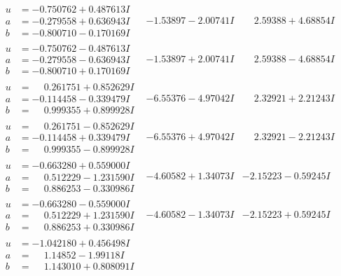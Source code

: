 \documentclass[1p]{elsarticle_modified}
\theoremstyle{definition}
\begin{document}
$$\begin{array}{c|c|c}
\begin{aligned}
u &= -0.750762 + 0.487613 I \\
a &= -0.279558 + 0.636943 I \\
b &= -0.800710 - 0.170169 I\end{aligned}
 & -1.53897 - 2.00741 I & \phantom{-}2.59388 + 4.68854 I \\ \hline\begin{aligned}
u &= -0.750762 - 0.487613 I \\
a &= -0.279558 - 0.636943 I \\
b &= -0.800710 + 0.170169 I\end{aligned}
 & -1.53897 + 2.00741 I & \phantom{-}2.59388 - 4.68854 I \\ \hline\begin{aligned}
u &= \phantom{-}0.261751 + 0.852629 I \\
a &= -0.114458 - 0.339479 I \\
b &= \phantom{-}0.999355 + 0.899928 I\end{aligned}
 & -6.55376 - 4.97042 I & \phantom{-}2.32921 + 2.21243 I \\ \hline\begin{aligned}
u &= \phantom{-}0.261751 - 0.852629 I \\
a &= -0.114458 + 0.339479 I \\
b &= \phantom{-}0.999355 - 0.899928 I\end{aligned}
 & -6.55376 + 4.97042 I & \phantom{-}2.32921 - 2.21243 I \\ \hline\begin{aligned}
u &= -0.663280 + 0.559000 I \\
a &= \phantom{-}0.512229 - 1.231590 I \\
b &= \phantom{-}0.886253 - 0.330986 I\end{aligned}
 & -4.60582 + 1.34073 I & -2.15223 - 0.59245 I \\ \hline\begin{aligned}
u &= -0.663280 - 0.559000 I \\
a &= \phantom{-}0.512229 + 1.231590 I \\
b &= \phantom{-}0.886253 + 0.330986 I\end{aligned}
 & -4.60582 - 1.34073 I & -2.15223 + 0.59245 I \\ \hline\begin{aligned}
u &= -1.042180 + 0.456498 I \\
a &= \phantom{-}1.14852 - 1.99118 I \\
b &= \phantom{-}1.143010 + 0.808091 I\end{aligned}

\end{array}$$
\end{document}
